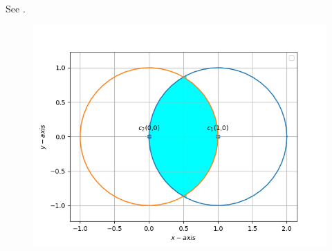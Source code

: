 See .
\begin{figure}[!h]
	\begin{center} 
	    \includegraphics[width=\columnwidth]{chapters/12/8/2/2/figs/inter1}
	\end{center}
\caption{}
\label{fig:chapters/12/8/2/2/Fig1}
\end{figure}


















